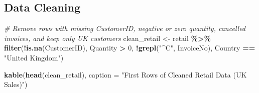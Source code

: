 \documentclass[
]{article}
\newenvironment{Shaded}{\begin{snugshade}}{\end{snugshade}}
\newcommand{\AttributeTok}[1]{\textcolor[rgb]{0.13,0.29,0.53}{#1}}
\newcommand{\CommentTok}[1]{\textcolor[rgb]{0.56,0.35,0.01}{\textit{#1}}}
\newcommand{\DecValTok}[1]{\textcolor[rgb]{0.00,0.00,0.81}{#1}}
\newcommand{\FunctionTok}[1]{\textcolor[rgb]{0.13,0.29,0.53}{\textbf{#1}}}
\newcommand{\NormalTok}[1]{#1}
\newcommand{\OtherTok}[1]{\textcolor[rgb]{0.56,0.35,0.01}{#1}}
\newcommand{\SpecialCharTok}[1]{\textcolor[rgb]{0.81,0.36,0.00}{\textbf{#1}}}
\newcommand{\StringTok}[1]{\textcolor[rgb]{0.31,0.60,0.02}{#1}}
\begin{document}
\subsection{Data Cleaning}\label{data-cleaning}

\begin{Shaded}
\begin{Highlighting}[]
\CommentTok{\# Remove rows with missing CustomerID, negative or zero quantity, cancelled invoices, and keep only UK customers}
\NormalTok{clean\_retail }\OtherTok{\textless{}{-}}\NormalTok{ retail }\SpecialCharTok{\%\textgreater{}\%}
  \FunctionTok{filter}\NormalTok{(}\SpecialCharTok{!}\FunctionTok{is.na}\NormalTok{(CustomerID),}
\NormalTok{         Quantity }\SpecialCharTok{\textgreater{}} \DecValTok{0}\NormalTok{,}
         \SpecialCharTok{!}\FunctionTok{grepl}\NormalTok{(}\StringTok{"\^{}C"}\NormalTok{, InvoiceNo),}
\NormalTok{         Country }\SpecialCharTok{==} \StringTok{"United Kingdom"}\NormalTok{)}

\FunctionTok{kable}\NormalTok{(}\FunctionTok{head}\NormalTok{(clean\_retail), }\AttributeTok{caption =} \StringTok{"First Rows of Cleaned Retail Data (UK Sales)"}\NormalTok{)}
\end{Highlighting}
\end{Shaded}
\end{document}
